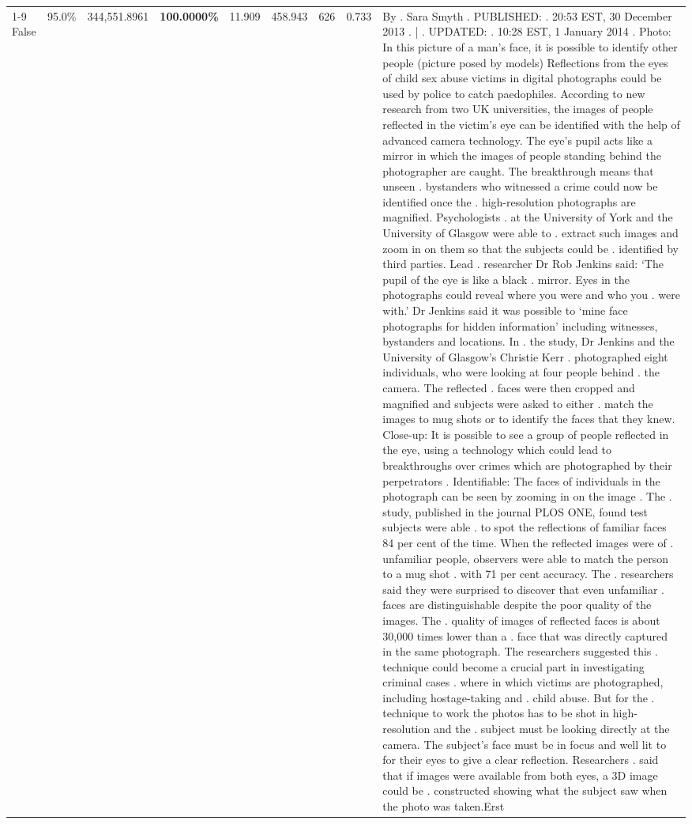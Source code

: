 \begin{table}[H]
\begin{tabular}{lllrlllll}
\cline{1-9}
False & 95.0\% & 344,551.8961 & \bfseries \color{red} 100.0000\% & 11.909 & 458.943 & 626 & 0.733 & By . Sara Smyth . PUBLISHED: . 20:53 EST, 30 December 2013 . | . UPDATED: . 10:28 EST, 1 January 2014 . Photo: In this picture of a man's face, it is possible to identify other people (picture posed by models) Reflections from the eyes of child sex abuse victims in digital photographs could be used by police to catch paedophiles. According to new research from two UK universities, the images of people reflected in the victim's eye can be identified with the help of advanced camera technology. The eye's pupil acts like a mirror in which the images of people standing behind the photographer are caught. The breakthrough means that unseen . bystanders who witnessed a crime could now be identified once the . high-resolution photographs are magnified. Psychologists . at the University of York and the University of Glasgow were able to . extract such images and zoom in on them so that the subjects could be . identified by third parties. Lead . researcher Dr Rob Jenkins said: ‘The pupil of the eye is like a black . mirror. Eyes in the photographs could reveal where you were and who you . were with.' Dr Jenkins said it was possible to ‘mine face photographs for hidden information' including witnesses, bystanders and locations. In . the study, Dr Jenkins and the University of Glasgow's Christie Kerr . photographed eight individuals, who were looking at four people behind . the camera. The reflected . faces were then cropped and magnified and subjects were asked to either . match the images to mug shots or to identify the faces that they knew. Close-up: It is possible to see a group of people reflected in the eye, using a technology which could lead to breakthroughs over crimes which are photographed by their perpetrators . Identifiable: The faces of individuals in the photograph can be seen by zooming in on the image . The . study, published in the journal PLOS ONE, found test subjects were able . to spot the reflections of familiar faces 84 per cent of the time. When the reflected images were of . unfamiliar people, observers were able to match the person to a mug shot . with 71 per cent accuracy. The . researchers said they were surprised to discover that even unfamiliar . faces are distinguishable despite the poor quality of the images. The . quality of images of reflected faces is about 30,000 times lower than a . face that was directly captured in the same photograph. The researchers suggested this . technique could become a crucial part in investigating criminal cases . where in which victims are photographed, including hostage-taking and . child abuse. But for the . technique to work the photos has to be shot in high-resolution and the . subject must be looking directly at the camera. The subject's face must be in focus and well lit to for their eyes to give a clear reflection. Researchers . said that if images were available from both eyes, a 3D image could be . constructed showing what the subject saw when the photo was taken.Erst \\

\end{tabular}
\end{table}

